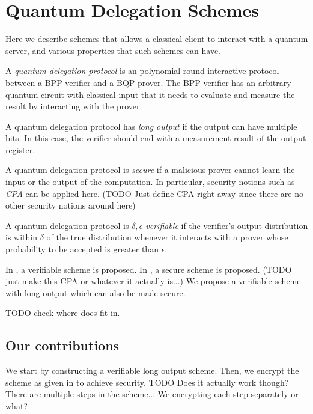 \section{Quantum Delegation Schemes}

Here we describe schemes that allows a classical client to interact with a quantum server, and various properties that such schemes can have.

\begin{definition}
	A \emph{quantum delegation protocol} is an polynomial-round interactive protocol between a BPP verifier and a BQP prover. The BPP verifier has an arbitrary quantum circuit with classical input that it needs to evaluate and measure the result by interacting with the prover.
\end{definition}

\begin{definition}
	A quantum delegation protocol has \emph{long output} if the output can have multiple bits. In this case, the verifier should end with a measurement result of the output register.
\end{definition}

\begin{definition}
	A quantum delegation protocol is \emph{secure} if a malicious prover cannot learn the input or the output of the computation. In particular, security notions such as \emph{CPA} can be applied here. (TODO Just define CPA right away since there are no other security notions around here)
\end{definition}

\begin{definition}
	A quantum delegation protocol is \emph{$\delta,\epsilon$-verifiable} if the verifier's output distribution is within $\delta$ of the true distribution whenever it interacts with a prover whose probability to be accepted is greater than $\epsilon$.
\end{definition}

In \cite{mahadev_delegation}, a verifiable scheme is proposed. In \cite{mahadev_qfhe}, a secure scheme is proposed. (TODO just make this CPA or whatever it actually is...) We propose a verifiable scheme with long output which can also be made secure.

TODO check where does \cite{1904.06320} fit in.

\subsection{Our contributions}

We start by constructing a verifiable long output scheme. Then, we encrypt the scheme as given in \cite{mahadev_delegation} to achieve security. TODO Does it actually work though? There are multiple steps in the scheme... We encrypting each step separately or what?
